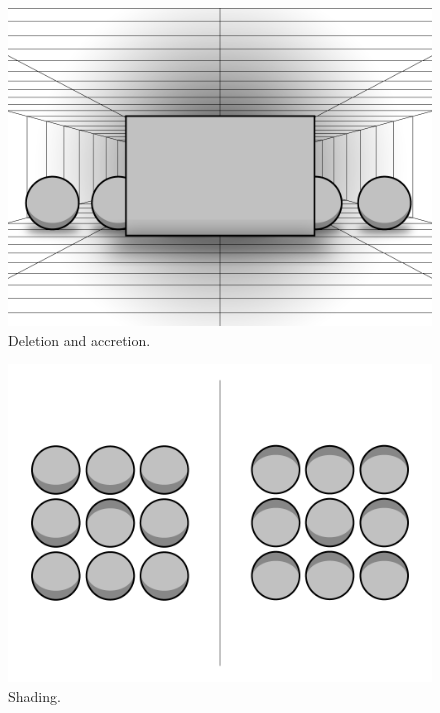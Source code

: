 \begin{figure}[H]
	\centering
	\includegraphics[width=1\linewidth]{figure/Analysis/deletionAccretion.png}
	\caption{Deletion and accretion.}
	\label{fig:deletionAccretion}
\end{figure}

\begin{figure}[H]
	\centering
	\includegraphics[width=1\linewidth]{figure/Analysis/shading.png}
	\caption{Shading.}
	\label{fig:shading}
\end{figure}

